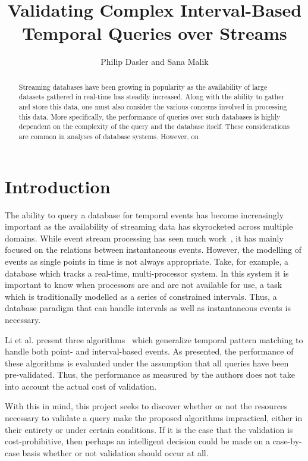 \documentclass{achemso}
\title{Validating Complex Interval-Based Temporal Queries over Streams}
\author{
Philip Dasler and Sana Malik}
\affiliation{University of Maryland, College Park, MD 20740}
\begin{document}
\maketitle
\begin{abstract}
Streaming databases have been growing in popularity as the availability of large datasets gathered in real-time has steadily increased.  Along with the ability to gather and store this data, one must also consider the various concerns involved in processing this data.  More specifically, the performance of queries over such databases is highly dependent on the complexity of the query and the database itself.  These considerations are common in analyses of database systems.  However, on 
\end{abstract}
\section{Introduction}
The ability to query a database for temporal events has become increasingly important as the availability of streaming data has skyrocketed across multiple domains. While event stream processing has seen much work~\cite{Agrawal:2008, Akdere:2008, Ding:2008, Wu:2006, Brenna:2007, Li:2009, Li:2010, Liu:2009}, it has mainly focused on the relations between instantaneous events. However, the modelling of events as single points in time is not always appropriate. Take, for example, a database which tracks a real-time, multi-processor system. In this system it is important to know when processors are and are not available for use, a task which is traditionally modelled as a series of constrained intervals. Thus, a database paradigm that can handle intervals as well as instantaneous events is necessary.

Li et al. present three algorithms~\cite{Li:2011} which generalize temporal pattern matching to handle both point- and interval-based events. As presented, the performance of these algorithms is evaluated under the assumption that all queries have been pre-validated. Thus, the performance as measured by the authors does not take into account the actual cost of validation.

With this in mind, this project seeks to discover whether or not the resources necessary to validate a query make the proposed algorithms impractical, either in their entirety or under certain conditions. If it is the case that the validation is cost-prohibitive, then perhaps an intelligent decision could be made on a case-by-case basis whether or not validation should occur at all.
\end{document}
